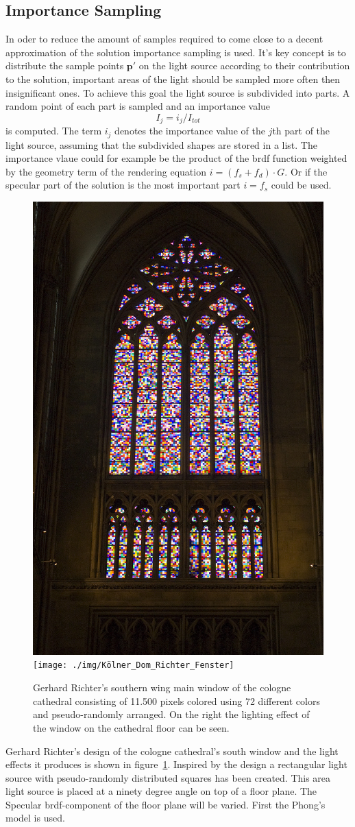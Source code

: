 \subsection{Importance Sampling}
In oder to  reduce the amount of samples required to come close to a decent approximation of the solution importance sampling is used. It's key concept is to distribute the sample points $\mathbf{p}'$ on the light source according to their contribution to the solution, important areas of the light should be sampled more often then insignificant ones. To achieve this goal the light source is subdivided into parts. A random point of each part is sampled and an importance value
\begin{equation}
I_j = i_j/I_{tot}
\end{equation}
is computed. The term $i_j$ denotes the importance value of the $j$th part of the light source, assuming that the subdivided shapes are stored in a list. The importance vlaue could for example be the product of the brdf function weighted by the geometry term of the rendering equation $i = (f_s + f_d) \cdot G$. Or if the specular part of the solution is the most important part $i = f_s$ could be used. \\
\begin{figure}
\centering
\includegraphics[width=0.25\linewidth]{./img/Richter_window_Cologne_Cathedral}
\texttt{[image: ./img/Kölner\_Dom\_Richter\_Fenster]}
\caption{Gerhard Richter's southern wing main window of the cologne cathedral consisting of 11.500 pixels colored using 72 different colors and pseudo-randomly arranged. On the right the lighting effect of the window on the cathedral floor can be seen.}
\label{fig:Richter_window_Cologne_Cathedral}
\end{figure}
Gerhard Richter's design of the cologne cathedral's south window and the light effects it produces is shown in figure~\ref{fig:Richter_window_Cologne_Cathedral}. Inspired by the design a rectangular light source with pseudo-randomly distributed squares has been created. This area light source is placed at a ninety degree angle on top of a floor plane. The Specular brdf-component of the floor plane will be varied. First the Phong's model is used. 

